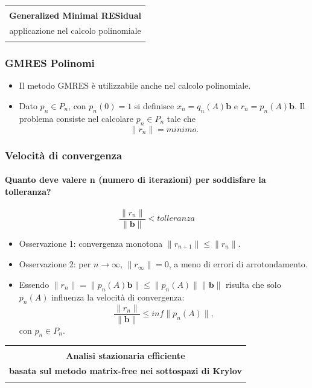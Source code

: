 \documentclass[10pt]{beamer}
\begin{document}
\begin{frame} 
\begin{center}
\begin{tabular}{ c }
\hline\\
\textbf{Generalized Minimal RESidual} \\ [0.5ex]
applicazione nel calcolo polinomiale\\ \\
 \hline
\end{tabular}
\end{center}
\end{frame}


\begin{frame} 
\frametitle{GMRES Polinomi}
\begin{itemize}
    \item Il metodo GMRES è utilizzabile anche nel calcolo polinomiale.
    \item Dato $p_n\in P_n$, con $p_n(0)=1$ si definisce $x_n=q_n(A)\mathbf{b}$ e $r_n=p_n(A)\mathbf{b}$. Il problema consiste nel calcolare $p_n\in P_n$ tale che $$\|r_n\|=minimo.$$
\end{itemize}
\end{frame}


\begin{frame} \frametitle{Velocità di convergenza}\framesubtitle{Quanto deve valere \textbf{n} (numero di iterazioni) per soddisfare la tolleranza?}
    $$ \frac{\|r_n\|}{\|\mathbf{b}\|}  < tolleranza$$
\begin{itemize}
    \item Osservazione 1: convergenza monotona $\|r_{n+1}\|\leq \|r_n\|$.
    \item Osservazione 2: per $n\to \infty$, $\|r_{\infty} \|= 0$, a meno di errori di arrotondamento.
    \item Essendo $\|r_n\| = \|p_n(A) \mathbf{b}\| \leq\|p_n(A)\|\|\mathbf{b}\|$ risulta che solo $p_n(A)$ influenza la velocità di convergenza: $$\frac{\|r_n\|}{\|\mathbf{b}\|} \leq inf\|p_n(A)\|,$$ con $p_n \in P_n$.
\end{itemize}
\end{frame}


\begin{frame} 
\begin{center}
\begin{tabular}{ c }
\hline\\
 \textbf{Analisi stazionaria efficiente} \\ [0.5ex]
  \textbf{basata sul metodo matrix-free nei sottospazi di Krylov}\\ \\
 \hline
\end{tabular}
\end{center}
\end{frame}
\end{document}

